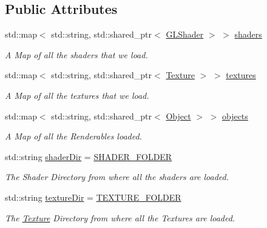 \subsection*{Public Attributes}
\begin{DoxyCompactItemize}
\item 
std\+::map$<$ std\+::string, std\+::shared\+\_\+ptr$<$ \mbox{\hyperlink{classpiolot_1_1_g_l_shader}{G\+L\+Shader}} $>$ $>$ \mbox{\hyperlink{classpiolot_1_1_asset_manager_ae8db7f8aa294e32d270181e4ba87d2ad}{shaders}}
\begin{DoxyCompactList}\small\item\em A Map of all the shaders that we load. \end{DoxyCompactList}\item 
std\+::map$<$ std\+::string, std\+::shared\+\_\+ptr$<$ \mbox{\hyperlink{classpiolot_1_1_texture}{Texture}} $>$ $>$ \mbox{\hyperlink{classpiolot_1_1_asset_manager_a6d9403a544a3efd67e33b52d6bb2a182}{textures}}
\begin{DoxyCompactList}\small\item\em A Map of all the textures that we load. \end{DoxyCompactList}\item 
std\+::map$<$ std\+::string, std\+::shared\+\_\+ptr$<$ \mbox{\hyperlink{classpiolot_1_1_object}{Object}} $>$ $>$ \mbox{\hyperlink{classpiolot_1_1_asset_manager_a5051f83ff594361ac33d94a885afde10}{objects}}
\begin{DoxyCompactList}\small\item\em A Map of all the Renderables loaded. \end{DoxyCompactList}\item 
std\+::string \mbox{\hyperlink{classpiolot_1_1_asset_manager_a0c7c10a24343176f2de6aeb2ddf1ac0d}{shader\+Dir}} = \mbox{\hyperlink{_folder_locations_8h_abcb8d25bec836dd9c9bf096e180aa64b}{S\+H\+A\+D\+E\+R\+\_\+\+F\+O\+L\+D\+ER}}
\begin{DoxyCompactList}\small\item\em The Shader Directory from where all the shaders are loaded. \end{DoxyCompactList}\item 
std\+::string \mbox{\hyperlink{classpiolot_1_1_asset_manager_a001707738b5a8e9da3fd5bfd3557392a}{texture\+Dir}} = \mbox{\hyperlink{_folder_locations_8h_a6091860db09533ddbf7ce1b197eaaead}{T\+E\+X\+T\+U\+R\+E\+\_\+\+F\+O\+L\+D\+ER}}
\begin{DoxyCompactList}\small\item\em The \mbox{\hyperlink{classpiolot_1_1_texture}{Texture}} Directory from where all the Textures are loaded. \end{DoxyCompactList}\end{DoxyCompactItemize}


